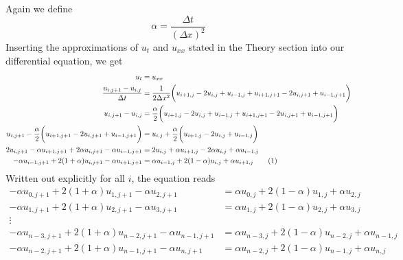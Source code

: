 \documentclass[reprint, english,notitlepage,nofootinbib]{revtex4-1}  %
\newcommand\numberthis{\addtocounter{equation}{1}\tag{\theequation}}
\begin{document}
Again we define
\begin{equation*}
  \alpha = \frac{\Delta t}{(\Delta x)^2}
\end{equation*}
Inserting the approximations of $u_t$ and $u_{xx}$ stated in the Theory section into our differential equation, we get
\begin{align*}
  u_t &= u_{xx} \\
  \frac{u_{i, j+1} - u_{i, j}}{\Delta t}
    &= \frac{1}{2 \Delta x^2} \bigg(u_{i+1, j} - 2u_{i,j} + u_{i-1, j}
      + u_{i+1, j + 1} - 2u_{i, j + 1} + u_{i - 1, j + 1} \bigg) \\
  u_{i, j+1} - u_{i, j} &= \frac{\alpha}{2} \bigg(u_{i+1, j} - 2u_{i,j} + u_{i-1, j}
      + u_{i+1, j+1} - 2u_{i, j+1} + u_{i-1, j+1} \bigg) \\
  u_{i, j+1} - \frac{\alpha}{2} \bigg( u_{i+1, j+1} - 2u_{i, j+1} + u_{i-1, j+1} \bigg)
    &= u_{i, j} + \frac{\alpha}{2} \bigg(u_{i+1, j}  - 2u_{i,j} + u_{i-1, j} \bigg) \\
  2 u_{i, j+1} - \alpha u_{i+1, j+1} + 2 \alpha u_{i, j+1} - \alpha u_{i-1, j+1}
    &= 2 u_{i, j} + \alpha u_{i+1, j}  - 2 \alpha u_{i,j} + \alpha u_{i-1, j} \\
  - \alpha u_{i-1, j+1} + 2 (1 + \alpha) u_{i, j+1} - \alpha u_{i+1, j+1}
    &= \alpha u_{i-1, j}  + 2 (1 - \alpha) u_{i,j} + \alpha u_{i+1, j} \numberthis \label{eq:CrankNicolson}
\end{align*}
Written out explicitly for all $i$, the equation reads
\begin{align*}
  - \alpha u_{0, j+1} + 2 (1 + \alpha) u_{1, j+1} - \alpha u_{2, j+1}
    &= \alpha u_{0, j}  + 2 (1 - \alpha) u_{1,j} + \alpha u_{2, j} \\
  - \alpha u_{1, j+1} + 2 (1 + \alpha) u_{2, j+1} - \alpha u_{3, j+1}
    &= \alpha u_{1, j}  + 2 (1 - \alpha) u_{2,j} + \alpha u_{3, j} \\
    \vdots \\
  - \alpha u_{n-3, j+1} + 2 (1 + \alpha) u_{n-2, j+1} - \alpha u_{n-1, j+1}
    &= \alpha u_{n-3, j}  + 2 (1 - \alpha) u_{n-2,j} + \alpha u_{n-1, j} \\
  - \alpha u_{n-2, j+1} + 2 (1 + \alpha) u_{n-1, j+1} - \alpha u_{n, j+1}
    &= \alpha u_{n-2, j}  + 2 (1 - \alpha) u_{n-1,j} + \alpha u_{n, j}
\end{align*}
\end{document}
